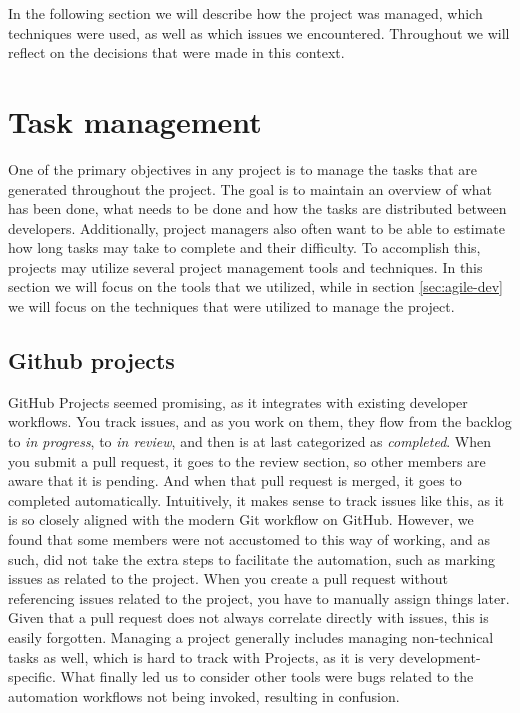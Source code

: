 In the following section we will describe how the project was managed, which techniques were used, as well as which issues we encountered. Throughout we will reflect on the decisions that were made in this context.

\section{Task management}
One of the primary objectives in any project is to manage the tasks that are generated throughout the project. The goal is to maintain an overview of what has been done, what needs to be done and how the tasks are distributed between developers. Additionally, project managers also often want to be able to estimate how long tasks may take to complete and their difficulty. To accomplish this, projects may utilize several project management tools and techniques. In this section we will focus on the tools that we utilized, while in section \ref{sec:agile-dev} we will focus on the techniques that were utilized to manage the project.

\subsection{Github projects}
GitHub Projects seemed promising, as it integrates with existing developer workflows. You track issues, and as you work on them, they flow from the backlog to \textit{in progress}, to \textit{in review}, and then is at last categorized as \textit{completed}. When you submit a pull request, it goes to the review section, so other members are aware that it is pending. And when that pull request is merged, it goes to completed automatically.
Intuitively, it makes sense to track issues like this, as it is so closely aligned with the modern Git workflow on GitHub. 
However, we found that some members were not accustomed to this way of working, and as such, did not take the extra steps to facilitate the automation, such as marking issues as related to the project.
When you create a pull request without referencing issues related to the project, you have to manually assign things later. Given that a pull request does not always correlate directly with issues, this is easily forgotten.
Managing a project generally includes managing non-technical tasks as well, which is hard to track with Projects, as it is very development-specific.
What finally led us to consider other tools were bugs related to the automation workflows not being invoked, resulting in confusion.

